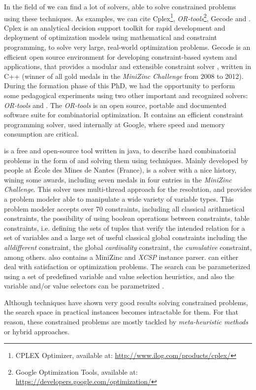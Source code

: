 In the field of \cp{} we can find a lot of solvers, able to solve constrained problems using these techniques. As examples, we can cite {\sc Cplex}\footnote{CPLEX Optimizer, available at: \href{http://www.ilog.com/products/cplex/}{http://www.ilog.com/products/cplex/}}, \textit{OR-tools}\footnote{Google Optimization Tools, available at: \href{https://developers.google.com/optimization/}{https://developers.google.com/optimization/}}, {\sc Gecode} and \choco. {\sc Cplex} is an analytical decision support toolkit for rapid development and deployment of optimization models using mathematical and constraint programming, to solve very large, real-world optimization problems. {\sc Gecode} is an efficient open source environment for developing constraint-based system and applications, that provides a modular and extensible constraint solver \cite{Gecode}, written in C++ (winner of all gold medals in the \textit{MiniZinc Challenge} from 2008 to 2012). During the formation phase of this PhD, we had the opportunity to perform some pedagogical experiments using two other important and recognized solvers: \textit{OR-tools} and \choco. The \textit{OR-tools} is an open source, portable and documented software suite for combinatorial optimization. It contains an efficient  constraint programming solver, used internally at Google, where speed and memory consumption are critical.

\choco{} is a free and open-source tool written in java, to describe hard combinatorial problems in the form of \csps{} and solving them using \CP{} techniques. Mainly developed by people at \'Ecole des Mines de Nantes (France), is a solver with a nice history, wining some awards, including seven medals in four entries in the \textit{MiniZinc Challenge}. This solver uses multi-thread approach for the resolution, and provides a problem modeler able to manipulate a wide variety of variable types. This problem modeler accepts over 70 constraints, including all classical arithmetical constraints, the possibility of using boolean operations between constraints, table constraints, i.e. defining the sets of tuples that verify the intended relation for a set of variables and a large set of useful classical global constraints including the \textit{alldifferent} constraint, the global \textit{cardinality} constraint, the \textit{cumulative} constraint, among others. \choco{} also contains a {\sc MiniZinc} and \textit{XCSP} instance parser. 
\choco{} can either deal with satisfaction or optimization problems. The search can be parameterized using a set of predefined variable and value selection heuristics, and also the variable and/or value selectors can be parametrized \cite{Jussien2008, Prudhomme2016}.

Although \cp{} techniques have shown very good results solving constrained problems, the search space in practical instances becomes intractable for them. For that reason, these constrained problems are mostly tackled by {\it meta-heuristic methods} or hybrid approaches. %